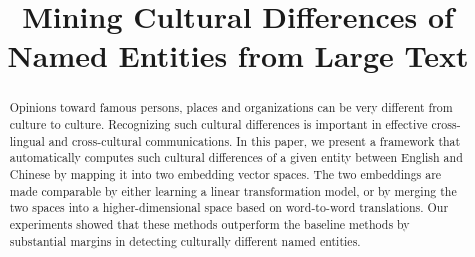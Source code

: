 \documentclass[letterpaper]{article}
\begin{document}
%
\title{Mining Cultural Differences of Named Entities from Large Text}
\maketitle
\begin{abstract}
Opinions toward famous persons, places and organizations can be
very different from culture to culture. Recognizing such
cultural differences is important in effective cross-lingual and cross-cultural
communications. In this paper, we present a framework that
automatically computes such cultural differences of a given entity between English and
Chinese by mapping it into two embedding vector spaces.
The two embeddings are made comparable by either learning a linear
transformation model, or by merging the two spaces into a higher-dimensional
space based on word-to-word translations. Our experiments showed that
these methods outperform the baseline methods by substantial margins in
detecting culturally different named entities.
\end{abstract}








\end{document}
